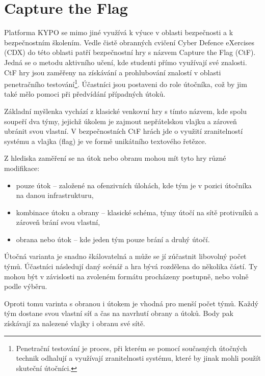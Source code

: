 \documentclass[
  digital, %
  oneside, %
  table,   %
  nolof,     %
  nolot,     %
]{fithesis3}
\begin{document}
\section{Capture the Flag}
Platforma KYPO se mimo jiné využívá k výuce v oblasti bezpečnosti a k bezpečnostním školením. Vedle čistě obranných cvičení Cyber Defence eXercises (CDX) do této oblasti patří bezpečnostní hry s názvem Capture the Flag (CtF). \cite{ctfDesign} Jedná se o metodu aktivního učení, kde studenti přímo využívají své znalosti. CtF hry jsou zaměřeny na získávání a prohlubování znalostí v oblasti penetračního testování\footnote{Penetrační testování je proces, při kterém se pomocí současných útočných technik odhalují a využívají zranitelnosti systému, které by jinak mohli použít skuteční útočníci.}. Účastníci jsou postaveni do role útočníka, což by jim také mělo pomoci při předvídání případných útoků. \cite{lessons2015, ctfDesign}\par
Základní myšlenka vychází z klasické venkovní hry s tímto názvem, kde spolu soupeří dva týmy, jejichž úkolem je zajmout nepřátelskou vlajku a zároveň ubránit svou vlastní. V bezpečnostních CtF hrách jde o využití zranitelností systému a vlajka (flag) je ve formě unikátního textového řetězce.\par
Z hlediska zaměření se na útok nebo obranu mohou mít tyto hry různé modifikace: \cite{Dankovcikova2015thesis, ctfDesign}
\begin{itemize}
  \item pouze útok – založené na ofenzivních úlohách, kde tým je v pozici útočníka na danou infrastrukturu,
  \item kombinace útoku a obrany – klasické schéma, týmy útočí na sítě protivníků a zároveň brání svou vlastní,
  \item obrana nebo útok – kde jeden tým pouze brání a druhý útočí.
\end{itemize}
Útočná varianta je snadno škálovatelná a může se jí zúčastnit libovolný počet týmů. Účastníci následují daný scénář a hra bývá rozdělena do několika částí. Ty mohou být v závislosti na zvoleném formátu procházeny postupně, nebo volně podle výběru.\par
Oproti tomu varinta s obranou i útokem je vhodná pro menší počet týmů. Každý tým dostane svou vlastní síť a čas na navrhutí obrany a útoků. Body pak získávají za nalezené vlajky i obranu své sítě.\cite{Masarik2017thesis}
\end{document}

